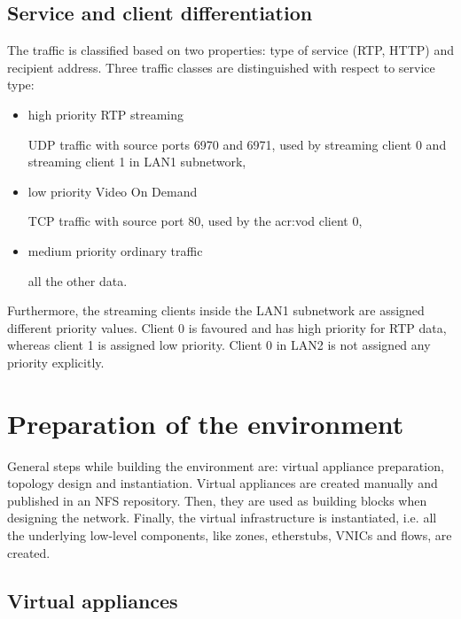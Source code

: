 \documentclass[11pt]{book}
\begin{document}
      \subsection{Service and client differentiation}
      \label{sub:uc:diff}

        The traffic is classified based on two properties: type of service (RTP, HTTP) and recipient address. Three
        traffic classes are distinguished with respect to service type:

        \begin{itemize}

          \item high priority RTP streaming

                UDP traffic with source ports 6970 and 6971, used by streaming client 0
                and streaming client 1 in LAN1 subnetwork,

          \item low priority Video On Demand
          
                TCP traffic with source port 80, used by the \gls{acr:vod} client 0,

          \item medium priority ordinary traffic
          
                all the other data.

        \end{itemize}

        Furthermore, the streaming clients inside the LAN1 subnetwork are assigned different priority values. Client 0 is
        favoured and has high priority for RTP data, whereas client 1 is assigned low priority. Client 0 in LAN2
        is not assigned any priority explicitly.


    \section{Preparation of the environment}
    \label{sec:uc:prep}

      General steps while building the environment are: virtual appliance preparation, topology design and
      instantiation. Virtual appliances are created manually and published in an NFS repository. Then, they are used as
      building blocks when designing the network. Finally, the virtual infrastructure is instantiated, i.e. all the
      underlying low-level components, like zones, etherstubs, VNICs and flows, are created.


      \subsection{Virtual appliances}
      \label{ssub:case:prep:va}
\end{document}
